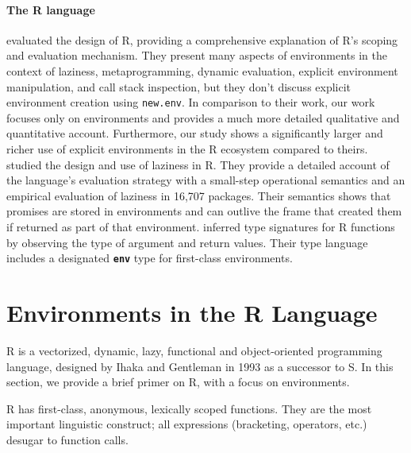 \documentclass[10pt,review,sigplan,anonymous=true,authorversion=true,nonacm=true]{acmart}
\newcommand{\code}[1]{\lstinline |#1|\xspace}
\begin{document}
\paragraph{The R language} \citet{ecoop12} evaluated the design of R, providing
a comprehensive explanation of R's scoping and evaluation mechanism. They
present many aspects of environments in the context of laziness,
metaprogramming, dynamic evaluation, explicit environment manipulation, and call
stack inspection, but they don't discuss explicit environment creation using
\code{new.env}. In comparison to their work, our work focuses only on
environments and provides a much more detailed qualitative and quantitative
account. Furthermore, our study shows a significantly larger and richer use of
explicit environments in the R ecosystem compared to theirs. \citet{oopsla19b}
studied the design and use of laziness in R. They provide a detailed account of
the language’s evaluation strategy with a small-step operational semantics and
an empirical evaluation of laziness in 16,707 packages. Their semantics shows
that promises are stored in environments and can outlive the frame that created
them if returned as part of that environment. \citet{oopsla20b} inferred type
signatures for R functions by observing the type of argument and return values.
Their type language includes a designated \textbf{\texttt{env}} type for
first-class environments.


\section{Environments in the R Language}

R is a vectorized, dynamic, lazy, functional and object-oriented programming
language, designed by Ihaka and Gentleman in 1993 as a successor to S. In this
section, we provide a brief primer on R, with a focus on environments.

R has first-class, anonymous, lexically scoped functions. They are the most
important linguistic construct; all expressions (bracketing, operators, etc.)
desugar to function calls.
\end{document}
